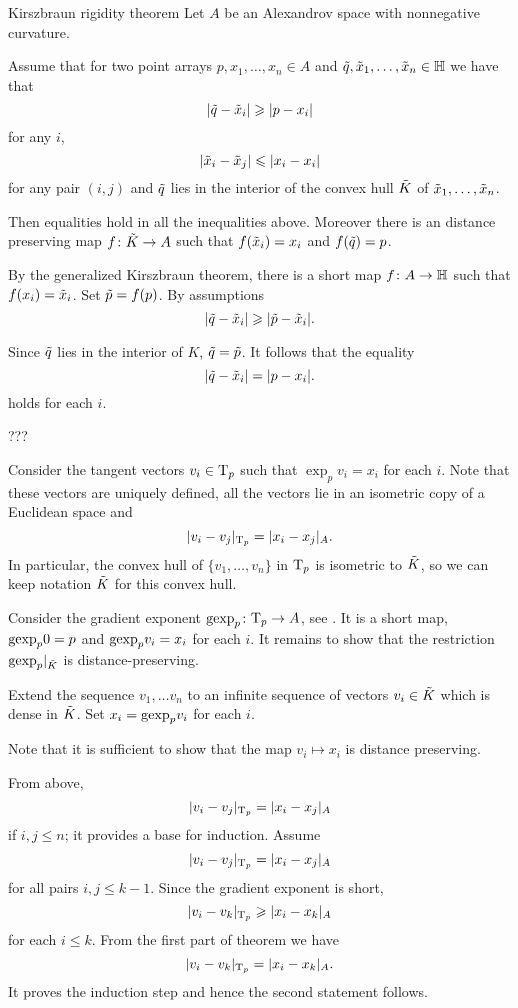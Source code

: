 \begin{thm}{Kirszbraun rigidity theorem}\label{thm:kirszbraun-rigid}
Let $A$ be an Alexandrov space with nonnegative curvature.

Assume that for two point arrays $p,x_1,\dots,x_n\in A$ and $\~q, \~x_1,\dots,\~x_n\in \HH$ we have that 
\[|\~q-\~x_i|\ge |p-x_i|\]
for any $i$,
\[|\~x_i-\~x_j|\le |x_i-x_i|\]
for any pair $(i,j)$
and $\~q$ lies in the interior of the convex hull $\~K$ of $\~x_1,\dots,\~x_n$.

Then equalities hold in all the inequalities above.
Moreover there is an distance preserving map $f\:\~K\to A$ such that $f(\~x_i)=x_i$ and $f(\~q)=p$. 
\end{thm}

By the generalized Kirszbraun theorem, there is a short map $f\:A\to \HH$
such that $f(x_i)=\~x_i$.
Set  $\~p=f(p)$.
By assumptions
\[|\~q-\~x_i|\ge |\~p-\~x_i|.\]

Since $\~q$ lies in the interior of $K$, $\~q=\~p$.
It follows that the equality 
\[|\~q-\~x_i|= |p-x_i|.\]
holds for each $i$.

???

Consider the tangent vectors $v_i\in\T_p$ such that $\exp_pv_i=x_i$ for each $i$.
Note that these vectors are uniquely defined,
all  the vectors lie in an isometric copy of a Euclidean space
and 
\[|v_i-v_j|_{\T_p}=|x_i-x_j|_A.\]
In particular, the convex hull of $\{v_1,\dots,v_n\}$ in $\T_p$ is isometric to $\~K$,
so we can keep notation  $\~K$ for this convex hull.

Consider the gradient exponent $\gexp_p\:\T_p\to A$, see \cite{AKP-book}.
It is a short map, $\gexp_p0=p$ and $\gexp_p v_i=x_i$ for each $i$.
It remains to show that the restriction $\gexp_p|_{\~K}$ is distance-preserving.

Extend the sequence $v_1,\dots v_n$ to an infinite sequence of vectors $v_i\in\~K$ which is dense in $\~K$.
Set $x_i=\gexp_pv_i$ for each $i$.

Note that it is sufficient to show that the map $v_i\mapsto x_i$ is distance preserving.

From above,
\[|v_i-v_j|_{\T_p}=|x_i-x_j|_A\]
if $i,j\le n$; it provides a base for induction.
Assume 
\[|v_i-v_j|_{\T_p}=|x_i-x_j|_A\]
for all pairs $i,j\le k-1$.
Since the gradient exponent is short,
\[|v_i-v_k|_{\T_p}\ge|x_i-x_k|_A\]
for each $i\le k$.
From the first part of theorem we have 
\[|v_i-v_k|_{\T_p}=|x_i-x_k|_A.\]
It proves the induction step and hence the second statement follows.
\qeds
